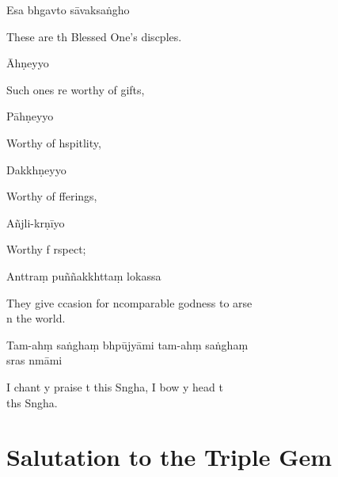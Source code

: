 Esa bhgavto sāvaksaṅgho

\begin{english}
  These are th Blessed One's discples.
\end{english}

Āhṇeyyo

\begin{english}
  Such ones re worthy of gifts,
\end{english}

Pāhṇeyyo

\begin{english}
  Worthy of hspitlity,
\end{english}

Dakkhṇeyyo

\begin{english}
  Worthy of fferings,
\end{english}

Añjli-krṇīyo

\begin{english}
  Worthy f rspect;
\end{english}

Anttraṃ puññakkhttaṃ lokassa

\begin{english}
  They give ccasion for ncomparable godness to arse \\n the world.
\end{english}

Tam-ahṃ saṅghaṃ bhpūjyāmi tam-ahṃ saṅghaṃ \\s{}ras nmāmi

\begin{english}
  I chant y praise t this Sngha, I bow y head t \\th{}s Sngha.
\end{english}


\chapter{Salutation to the Triple Gem}

\begin{leader}
\end{leader}

